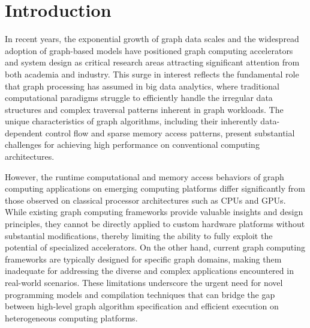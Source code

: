 \section{Introduction}
In recent years, the exponential growth of graph data scales and the widespread adoption of graph-based models have positioned graph computing accelerators 
and system design as critical research areas attracting significant attention from both academia and industry. 
This surge in interest reflects the fundamental role that graph processing has assumed in big data analytics, 
where traditional computational paradigms struggle to efficiently handle the irregular data structures and complex traversal patterns inherent in graph workloads. 
The unique characteristics of graph algorithms, including their inherently data-dependent control flow and sparse memory access patterns, 
present substantial challenges for achieving high performance on conventional computing architectures.

However, the runtime computational and memory access behaviors of graph computing applications on emerging computing platforms differ 
significantly from those observed on classical processor architectures such as CPUs and GPUs. 
While existing graph computing frameworks provide valuable insights and design principles, 
they cannot be directly applied to custom hardware platforms without substantial modifications, 
thereby limiting the ability to fully exploit the potential of specialized accelerators. 
On the other hand, current graph computing frameworks are typically designed for specific graph domains, 
making them inadequate for addressing the diverse and complex applications encountered in real-world scenarios. 
These limitations underscore the urgent need for novel programming models and compilation techniques 
that can bridge the gap between high-level graph algorithm specification and efficient execution on heterogeneous computing platforms.